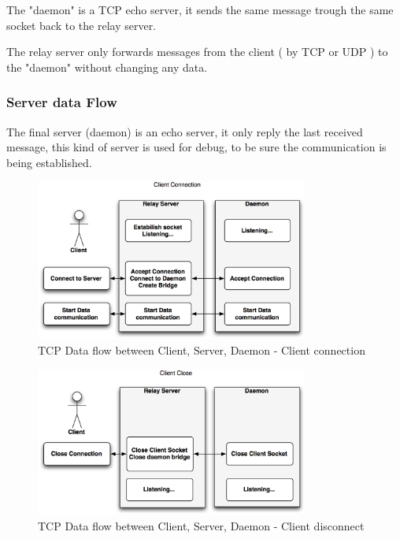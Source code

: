 The "daemon" is a TCP echo server, it sends the same message trough the same socket back to the relay server.

The relay server only forwards messages from the client ( by TCP or UDP ) to the "daemon" without changing any data.

\subsubsection{Server data Flow}

The final server (daemon) is an echo server, it only reply the last received message, this kind of server is used for debug, to be sure the communication is being established. 

\begin{figure}[H]
	\begin{centering}
		 \includegraphics[width=0.8\textwidth,page=2,angle=0]{content/appendix/eudp/images/dataflow1.png}
		\caption{TCP Data flow between Client, Server, Daemon - Client connection}
	\end{centering}
\end{figure}

\begin{figure}[H]
	\begin{centering}
		 \includegraphics[width=0.8\textwidth,page=2,angle=0]{content/appendix/eudp/images/dataflow2.png}
		\caption{TCP Data flow between Client, Server, Daemon - Client disconnect}
	\end{centering}
\end{figure}


